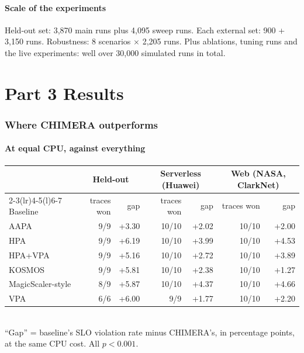 \documentclass[11pt,a4paper]{article}
\begin{document}
\subsection{Scale of the experiments}
Held-out set: 3,870 main runs plus 4,095 sweep runs. Each external set: 900 + 3,150 runs.
Robustness: 8 scenarios $\times$ 2,205 runs. Plus ablations, tuning runs and the live
experiments: well over 30,000 simulated runs in total.

\newpage
\part*{Part 3 \quad Results}

\section{Where CHIMERA outperforms}

\subsection{At equal CPU, against everything}
\begin{center}
\begin{tabular}{@{}lrrrrrr@{}}
\toprule
 & \multicolumn{2}{c}{Held-out} & \multicolumn{2}{c}{Serverless (Huawei)} & \multicolumn{2}{c}{Web (NASA, ClarkNet)} \\
\cmidrule(lr){2-3}\cmidrule(lr){4-5}\cmidrule(l){6-7}
Baseline & traces won & gap & traces won & gap & traces won & gap \\
\midrule
AAPA & 9/9 & +3.30 & 10/10 & +2.02 & 10/10 & +2.00 \\
HPA & 9/9 & +6.19 & 10/10 & +3.99 & 10/10 & +4.53 \\
HPA+VPA & 9/9 & +5.16 & 10/10 & +2.72 & 10/10 & +3.89 \\
KOSMOS & 9/9 & +5.81 & 10/10 & +2.38 & 10/10 & +1.27 \\
MagicScaler-style & 8/9 & +5.87 & 10/10 & +4.37 & 10/10 & +4.66 \\
VPA & 6/6 & +6.00 & 9/9 & +1.77 & 10/10 & +2.20 \\
\bottomrule
\end{tabular}\\[3pt]
\small ``Gap'' = baseline's SLO violation rate minus CHIMERA's, in percentage points, at the same CPU
cost. All $p<0.001$.
\end{center}
\end{document}

